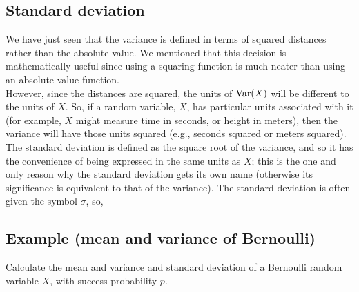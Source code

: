 \subsection{Standard deviation} \label{stdev}
We have just seen that the variance is defined in terms of squared distances rather than the absolute value. We mentioned that this decision is mathematically useful since using a squaring function is much neater than using an absolute value function. \\

\noindent However, since the distances are squared, the units of $\text{Var}(X)$ will be different to the units of $X$. So, if a random variable, $X$, has particular units associated with it (for example, $X$ might measure time in seconds, or height in meters), then the variance will have those units squared (e.g., seconds squared or meters squared). \\

\noindent The standard deviation is defined as the square root of the variance, and so it has the convenience of being expressed in the same units as $X$; this is the one and only reason why the standard deviation gets its own name (otherwise its significance is equivalent to that of the variance). The standard deviation is often given the symbol $\sigma$, so,

  	\bigskip
	
	\hfil{}
	\bigskip
	\bigskip
	
\subsection{Example (mean and variance of Bernoulli)} \label{meanvarBernoulli}
Calculate the mean and variance and standard deviation of a Bernoulli random variable $X$, with success probability $p$. \\

